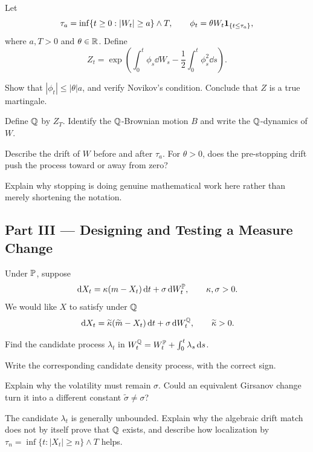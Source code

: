 \begin{exercise}
Let
\[
\tau_a=\inf\{t\geq0:|W_t|\geq a\}\wedge T,
\qquad
\phi_t=\theta W_t\mathbf{1}_{\{t\leq\tau_a\}},
\]
where \(a,T>0\) and \(\theta\in\mathbb{R}\). Define
\[
Z_t=\exp\!\left(
\int_0^t\phi_s\dd W_s-\frac12\int_0^t\phi_s^2\dd s
\right).
\]
\begin{exparts}
  \item Show that \(|\phi_t|\leq|\theta|a\), and verify Novikov's condition.
  Conclude that \(Z\) is a true martingale.
  \item Define \(\mathbb{Q}\) by \(Z_T\). Identify the \(\mathbb{Q}\)-Brownian motion
  \(B\) and write the \(\mathbb{Q}\)-dynamics of \(W\).
  \item Describe the drift of \(W\) before and after \(\tau_a\). For
  \(\theta>0\), does the pre-stopping drift push the process toward or away
  from zero?
  \item Explain why stopping is doing genuine mathematical work here rather
  than merely shortening the notation.
\end{exparts}
\end{exercise}

\subsection*{Part III --- Designing and Testing a Measure Change}

\begin{exercise}
Under \(\mathbb{P}\), suppose
\[
\,\mathrm{d} X_t=\kappa(m-X_t)\,\mathrm{d} t+\sigma\,\mathrm{d} W_t^{\mathbb{P}},
\qquad \kappa,\sigma>0.
\]
We would like \(X\) to satisfy under \(\mathbb{Q}\)
\[
\,\mathrm{d} X_t=\widetilde\kappa(\widetilde m-X_t)\,\mathrm{d} t
+\sigma\,\mathrm{d} W_t^{\mathbb{Q}},
\qquad \widetilde\kappa>0.
\]
\begin{exparts}
  \item Find the candidate process \(\lambda_t\) in
  \(W_t^{\mathbb{Q}}=W_t^{\mathbb{P}}+\int_0^t\lambda_s\,\mathrm{d} s\).
  \item Write the corresponding candidate density process, with the correct
  sign.
  \item Explain why the volatility must remain \(\sigma\). Could an
  equivalent Girsanov change turn it into a different constant
  \(\widetilde\sigma\neq\sigma\)?
  \item The candidate \(\lambda_t\) is generally unbounded. Explain why the
  algebraic drift match does not by itself prove that \(\mathbb{Q}\) exists, and
  describe how localization by
  \(\tau_n=\inf\{t:|X_t|\geq n\}\wedge T\) helps.
\end{exparts}
\end{exercise}

